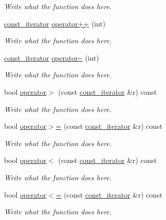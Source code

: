 \begin{DoxyCompactItemize}
\begin{DoxyCompactList}\small\item\em Write what the function does here. \end{DoxyCompactList}\item 
\hyperlink{classconst__iterator}{const\+\_\+iterator} \hyperlink{classconst__iterator_abe0107a6edb3690c47045fc1cc9407a0}{operator++} (int)
\begin{DoxyCompactList}\small\item\em Write what the function does here. \end{DoxyCompactList}\item 
\hyperlink{classconst__iterator}{const\+\_\+iterator} \hyperlink{classconst__iterator_aadadb07cf8e47b6c3f0a1fe81f793ec2}{operator-\/-\/} (int)
\begin{DoxyCompactList}\small\item\em Write what the function does here. \end{DoxyCompactList}\item 
bool \hyperlink{classconst__iterator_a4ed001eedf9d68f78823e50882d455a4}{operator$>$} (const \hyperlink{classconst__iterator}{const\+\_\+iterator} \&r) const 
\begin{DoxyCompactList}\small\item\em Write what the function does here. \end{DoxyCompactList}\item 
bool \hyperlink{classconst__iterator_a25e53458a5982ced22cca0105a2daa0a}{operator$>$=} (const \hyperlink{classconst__iterator}{const\+\_\+iterator} \&r) const 
\begin{DoxyCompactList}\small\item\em Write what the function does here. \end{DoxyCompactList}\item 
bool \hyperlink{classconst__iterator_a5309539c91e0826d82b4356265540be8}{operator$<$} (const \hyperlink{classconst__iterator}{const\+\_\+iterator} \&r) const 
\begin{DoxyCompactList}\small\item\em Write what the function does here. \end{DoxyCompactList}\item 
bool \hyperlink{classconst__iterator_a587b002ad6b6e15eb69bdcdc7b3c3543}{operator$<$=} (const \hyperlink{classconst__iterator}{const\+\_\+iterator} \&r) const 
\begin{DoxyCompactList}\small\item\em Write what the function does here. \end{DoxyCompactList}\end{DoxyCompactItemize}
